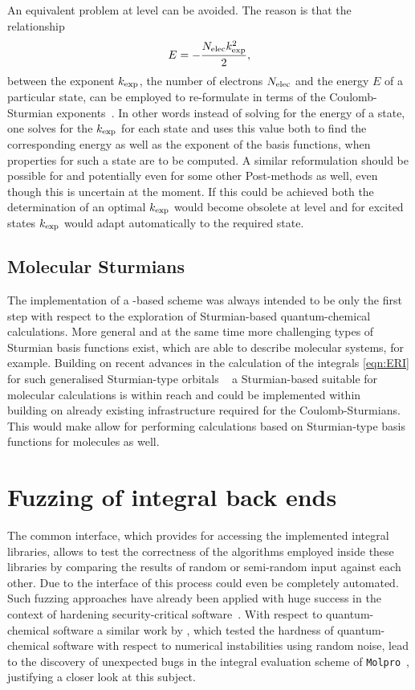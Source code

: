\noindent
An equivalent problem at \FCI level can be avoided.
The reason is that the relationship
\[ E = - \frac{N_\text{elec} k_\text{exp}^2}{2}, \]
between the \CS exponent $k_\text{exp}$, the number of electrons $N_\text{elec}$
and the energy $E$ of a particular state,
can be employed to re-formulate \FCI in terms of the
Coulomb-Sturmian exponents~\cite{Avery2006}.
In other words instead of solving for the energy of a state,
one solves for the $k_\text{exp}$ for each state
and uses this value both to find the corresponding energy
as well as the exponent of the basis functions,
when properties for such a state are to be computed.
A similar reformulation should be possible for \HF
and potentially even for some other Post-\HF methods as well,
even though this is uncertain at the moment.
If this could be achieved both the determination of an optimal
$k_\text{exp}$ would become obsolete at \HF level
and for excited states $k_\text{exp}$ would adapt automatically to the required state.

\subsection{Molecular Sturmians}
\label{sec:MolecularSturmian}
The implementation of a \CS-based \SCF scheme was always intended
to be only the first step with respect to the exploration
of Sturmian-based quantum-chemical calculations.
More general and at the same time more challenging types of Sturmian basis
functions exist,
which are able to describe molecular systems, for example.
Building on recent advances in the calculation of the \ERI integrals
\eqref{eqn:ERI} for such generalised Sturmian-type orbitals%
~\cite{Avery2006,Avery2011PhD,Avery2011,Morales2016,Avery2017,Randazzo2015,Granados2016}
a Sturmian-based \HF suitable for molecular calculations is within reach
and could be implemented within \sturmint~\cite{sturmintWeb}
building on already existing infrastructure required for the Coulomb-Sturmians.
This would make allow for performing calculations
based on Sturmian-type basis functions for molecules as well.


%
%
\section{Fuzzing of integral back ends}
\label{sec:Fuzzing}
The common interface, which \molsturm provides
for accessing the implemented integral libraries,
allows to test the correctness
of the algorithms employed inside these libraries
by comparing the results of
random or semi-random input against each other.
Due to the \python interface of \molsturm this process could
even be completely automated.
Such fuzzing approaches have already been applied with huge success
in the context of hardening security-critical software~\cite{Fuzzing}.
With respect to quantum-chemical software
a similar work by \citet{Knizia2011},
which tested the hardness of quantum-chemical software
with respect to numerical instabilities using random noise,
lead to the discovery of unexpected bugs
in the integral evaluation scheme of \texttt{Molpro}~\cite{Molpro},
justifying a closer look at this subject.
